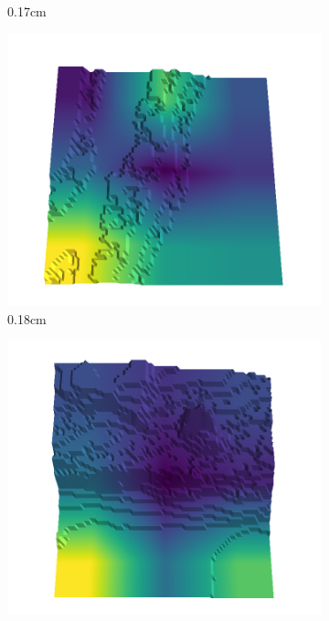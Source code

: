 \documentclass[../document.tex]{subfiles}
\begin{document}
\begin{figure}[H]
\begin{subfigure}[b]{0.192\linewidth}
\caption{0.17cm}
\label{fig : quarry-false_negative-17}
\end{subfigure}
\begin{subfigure}[b]{0.192\linewidth}
\includegraphics[width=\linewidth]{../img/5/quarry/false_negative/17-patch-3d-majavi-colormap-180.png}
\caption{0.18cm}
\label{fig : quarry-false_negative-18}
\end{subfigure}
\begin{subfigure}[b]{0.192\linewidth}
\includegraphics[width=\linewidth]{../img/5/quarry/false_negative/18-patch-3d-majavi-colormap-190.png}

\end{subfigure}
\end{figure}
\end{document}
